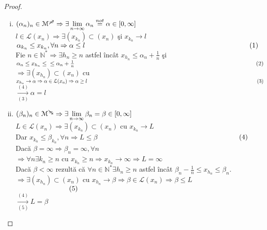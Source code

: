 \documentclass[ a4paper, 12pt]{report}
\theoremstyle{definition}
\theoremstyle{remark}
\numberwithin{equation}{section}
\begin{document}
\begin{proof}
\begin{enumerate}[(i)]
\item $(\alpha_n)_n \in \mathcal{M}^{\mc} \Rightarrow \exists \lim\limits_{n \rightarrow \infty} \alpha_n \stackrel{not}{=} \alpha \in [0,\infty]$\\
$l \in \mathcal{L}(x_n) \Rightarrow \exists (x_{k_n}) \subset (x_n)$ \c si $x_{k_n}\rightarrow l$\\
$\alpha_{k_n} \leq x_{k_n}, \forall n \Rightarrow \alpha \leq l \hspace{84mm} (1)$\\
Fie $n \in \mathbb{N}^\ast \Rightarrow \exists h_n \geq n $ astfel \^inc\^at $x_{h_n} \leq \alpha_n + \frac{1}{n}$ \c si $\alpha_n \leq x_{h_n} \leq \\
\leq \alpha_n + \frac{1}{n} \hspace{109mm} (2)$\\
$\Rightarrow \exists (x_{h_n}) \subset (x_n)$ cu $x_{h_n} \rightarrow \alpha \Rightarrow \alpha \in \mathcal{L}(x_n) \Rightarrow\\ \alpha \geq l \hspace{115mm} (3)$\\
$\xrightarrow[(3)]{(4)} \alpha = l$\\
\item $(\beta_n)_n \in \mathcal{M}^{\md} \Rightarrow \exists \lim\limits_{n \rightarrow \infty} \beta_n = \beta \in [0,\infty]$\\
$L \in \mathcal{L}(x_n) \Rightarrow \exists (x_{k_n}) \subset (x_n)$ cu $x_{k_n} \rightarrow L$\\
Dar $x_{k_n} \leq \beta_{k_n}, \forall n \Rightarrow L \leq \beta$ $\hspace{71mm}(4)$\\
Dac\u a $\beta=\infty \Rightarrow \beta_n = \infty, \forall n$\\
$\Rightarrow \forall n \exists k_n\geq n$ cu $x_{k_n} \geq n \Rightarrow x_{k_n} \rightarrow \infty \Rightarrow L=\infty$\\
Dac\u a $\beta < \infty$ rezult\u a c\u a $\forall n \in \mathbb{N}^\ast \exists h_n \geq n $ astfel \^inc\^at $\beta_n - \frac{1}{n} \leq x_{h_n} \leq \beta_n.$\\
$\Rightarrow \exists (x_{h_n}) \subset (x_n)$ cu $x_{h_n} \rightarrow \beta \Rightarrow \beta \in \mathcal{L}(x_n) \Rightarrow \beta \leq L$ $\hspace{27mm} (5)$\\
$\xrightarrow[(5)]{(4)} L = \beta $
\end{enumerate}
\end{proof}
\end{document}
